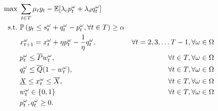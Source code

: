 	
	

\begin{subequations} \label{eqn: model}
\begin{align}
\max \,\, &  \sum_{t \in T} \mu_t y_t- {\mathbb E} [ \lambda_c p_t^\omega + \lambda_d q_t^\omega ] & \label{eqn: obj} \\
 \mbox{s.t.} \,\, &   {\mathbb P} \left( y_t \le s_t^\omega + q_t^\omega -  p_t^\omega,  \forall t\in T \right)  \ge \alpha & \label{eqn: chance} \\
& x_{t+1}^\omega = x_t^\omega +  \eta p_t^\omega - \frac{1}{\eta} q_t^\omega, & \forall t = 2, 3, \ldots T-1, \forall \omega \in \Omega     \label{eqn: balance}\\
& p_t^\omega \le {\overline{P}} w_t^\omega, & \forall t \in T, \forall \omega \in \Omega  \label{eqn: maxcharging}\\
& q_t^\omega \le {\overline{Q}} (1 - w_t^\omega), & \forall t \in T, \forall \omega \in \Omega  \label{eqn: maxdischarging}\\
& {\underline{X}} \le x_t^\omega \le {\overline{X}}, & \forall t \in T, \forall \omega \in \Omega  \label{eqn: maxcapacity}\\
& w_t^\omega \in \{ 0,1 \} & \forall t \in T, \forall \omega \in \Omega \label{eqn: binary} \\
& p_t^\omega, q_t^\omega  \ge 0. \label{eqn: positive} 
\end{align}
\end{subequations}

